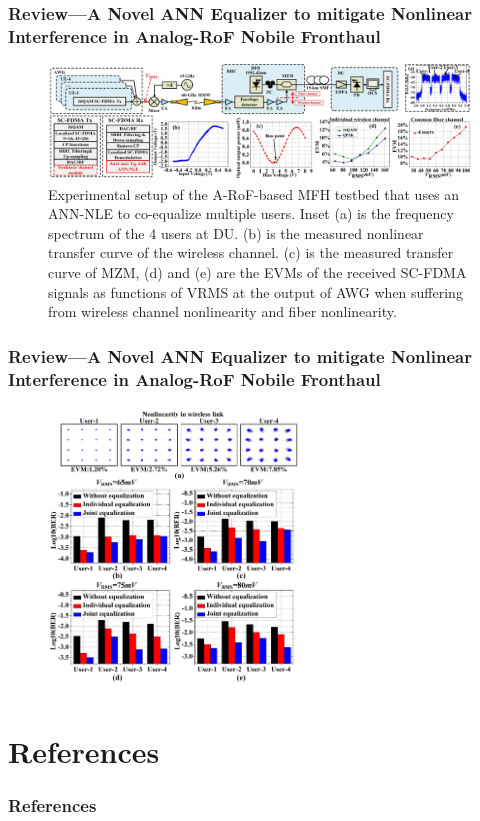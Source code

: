 \documentclass[t]{beamer}
\begin{document}
\begin{frame}
    \frametitle{Review---A Novel ANN Equalizer to mitigate Nonlinear Interference in Analog-RoF Nobile Fronthaul \cite{Liu2018a}}
    \begin{figure}
        \includegraphics[width=\textwidth]{novelANNSetup.PNG}
        \caption{Experimental setup of the A-RoF-based MFH testbed that uses an ANN-NLE to co-equalize multiple users. 
        Inset (a) is the frequency spectrum of the 4 users at DU. (b) is the measured nonlinear transfer curve of the wireless channel. 
        (c) is the measured transfer curve of MZM, (d) and (e) are the EVMs of the received SC-FDMA signals as functions of VRMS at the 
        output of AWG when suffering from wireless channel nonlinearity and fiber nonlinearity.}
    \end{figure}
\end{frame}

\begin{frame}
    \frametitle{Review---A Novel ANN Equalizer to mitigate Nonlinear Interference in Analog-RoF Nobile Fronthaul \cite{Liu2018a}}
    \begin{figure}
            
        \includegraphics[width=0.6\textwidth]{novelANNResult.PNG}             
    \end{figure}
\end{frame}

\section{References}
\begin{frame}[t,allowframebreaks]
    \frametitle{References}
    
    
    
\end{frame}



    
\end{document}
